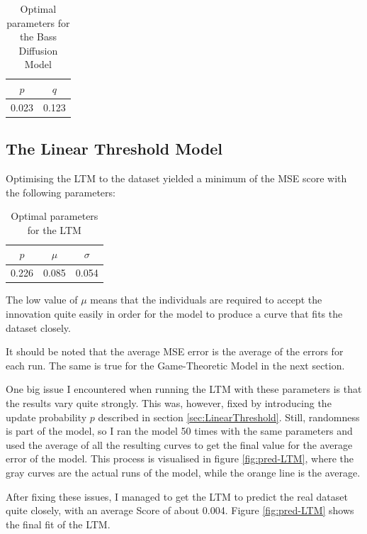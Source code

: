 \documentclass[11pt]{article}
\begin{document}
	\begin{table}[H]
		\centering
		\begin{tabular}{|c|c|}
			\hline
			$p$ & $q$     \\ \hline
			0.023 & 0.123 \\ \hline
		\end{tabular}
		\caption{Optimal parameters for the Bass Diffusion Model}
		\label{tab:paramsBass}
	\end{table}
	
	
	
	\subsection{The Linear Threshold Model} \label{LTM_results}
	Optimising the LTM to the dataset yielded a minimum of the MSE score with the following parameters: 
	
	\begin{table}[H]
		\centering
		\begin{tabular}{|c|c|c|}
			\hline
			$p$ & $\mu$ & $\sigma$ \\ \hline
			0.226 & 0.085  & 0.054 \\ \hline
		\end{tabular}
		\caption{Optimal parameters for the LTM}
		\label{tab:paramsLTM}
	\end{table}
	
	The low value of $\mu$ means that the individuals are required to accept the innovation quite easily in order for the model to produce a curve that fits the dataset closely.
	
	It should be noted that the average MSE error is the average of the errors for each run. The same is true for the Game-Theoretic Model in the next section.
	
	One big issue I encountered when running the LTM with these parameters is that the results vary quite strongly. This was, however, fixed by introducing the update probability $p$ described in section \ref{sec:LinearThreshold}. Still, randomness is part of the model, so I ran the model 50 times with the same parameters and used the average of all the resulting curves to get the final value for the average error of the model. This process is visualised in figure \ref{fig:pred-LTM}, where the gray curves are the actual runs of the model, while the orange line is the average.
	
	After fixing these issues, I managed to get the LTM to predict the real dataset quite closely, with an average Score of about 0.004. Figure \ref{fig:pred-LTM} shows the final fit of the LTM.
	
\end{document}
